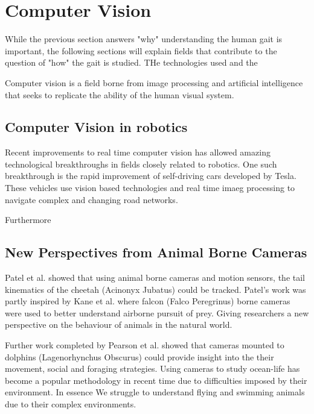 \section{Computer Vision}
While the previous section answers "why" understanding the human gait is important, the following sections will explain fields that contribute to the question of "how" the gait is studied. THe technologies used and the 

Computer vision is a field borne from image processing and artificial intelligence that seeks to replicate the ability of the human visual system.   







\subsection{Computer Vision in robotics}
Recent improvements to real time computer vision has allowed amazing technological breakthroughs in fields closely related to robotics. One such breakthrough is the rapid improvement of self-driving cars developed by Tesla. These vehicles use vision based technologies and real time imaeg processing to navigate complex and changing road networks. 

Furthermore 










\subsection{New Perspectives from Animal Borne Cameras}
Patel et al. \cite{patel2017trackingieee} showed that using animal borne cameras and motion sensors, the tail kinematics of the cheetah (Acinonyx Jubatus) could be tracked. Patel's work was partly inspired by Kane et al. \cite{kane2014falcons} where falcon (Falco Peregrinus) borne cameras were used to better understand airborne pursuit of prey. Giving researchers a new perspective on the behaviour of animals in the natural world.

Further work completed by Pearson et al. \cite{pearson2017testing} showed that cameras mounted to dolphins (Lagenorhynchus Obscurus) could provide insight into the their movement, social and foraging strategies. Using cameras to study ocean-life has become a popular methodology in recent time due to difficulties imposed by their environment. In essence We struggle to understand flying and swimming animals due to their complex environments.   









